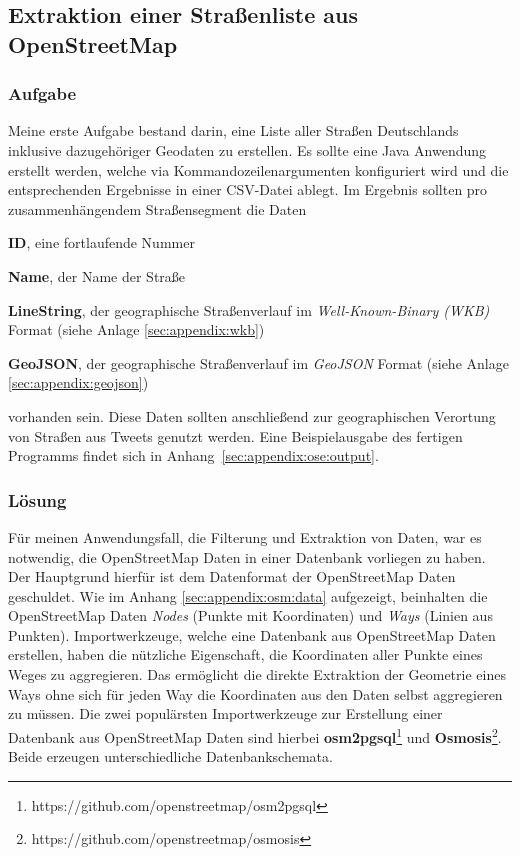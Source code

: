 \subsection{Extraktion einer Straßenliste aus OpenStreetMap}

\subsubsection{Aufgabe}
Meine erste Aufgabe bestand darin, eine Liste aller Straßen Deutschlands inklusive dazugehöriger Geodaten zu erstellen.
Es sollte eine Java Anwendung erstellt werden, welche via Kommandozeilenargumenten konfiguriert wird und die entsprechenden Ergebnisse in einer CSV-Datei ablegt.
Im Ergebnis sollten pro zusammenhängendem Straßensegment die Daten
\begin{compactitem}
  \item \textbf{ID}, eine fortlaufende Nummer
  \item \textbf{Name}, der Name der Straße
  \item \textbf{LineString}, der geographische Straßenverlauf im \textit{Well-Known-Binary (WKB)} Format (siehe Anlage \ref{sec:appendix:wkb})
  \item \textbf{GeoJSON}, der geographische Straßenverlauf im \textit{GeoJSON} Format (siehe Anlage \ref{sec:appendix:geojson})
\end{compactitem}
vorhanden sein.
Diese Daten sollten anschließend zur geographischen Verortung von Straßen aus Tweets genutzt werden.
Eine Beispielausgabe des fertigen Programms findet sich in Anhang~\ref{sec:appendix:ose:output}.

\subsubsection{Lösung}

Für meinen Anwendungsfall, die Filterung und Extraktion von Daten, war es notwendig, die OpenStreetMap Daten in einer Datenbank vorliegen zu haben.
Der Hauptgrund hierfür ist dem Datenformat der OpenStreetMap Daten geschuldet. Wie im Anhang \ref{sec:appendix:osm:data} aufgezeigt, beinhalten die OpenStreetMap Daten \textit{Nodes} (Punkte mit Koordinaten) und \textit{Ways} (Linien aus Punkten).
Importwerkzeuge, welche eine Datenbank aus OpenStreetMap Daten erstellen, haben die nützliche Eigenschaft, die Koordinaten aller Punkte eines Weges zu aggregieren.
Das ermöglicht die direkte Extraktion der Geometrie eines Ways ohne sich für jeden Way die Koordinaten aus den Daten selbst aggregieren zu müssen.
Die zwei populärsten Importwerkzeuge zur Erstellung einer Datenbank aus OpenStreetMap Daten sind hierbei \textbf{osm2pgsql}\footnote{https://github.com/openstreetmap/osm2pgsql}\label{osm2pgsql} und \textbf{Osmosis}\footnote{https://github.com/openstreetmap/osmosis}.
Beide erzeugen unterschiedliche Datenbankschemata.

